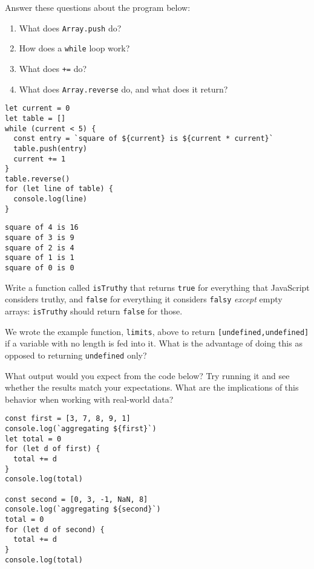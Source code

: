 
Answer these questions about the program below:

\begin{enumerate}
\item
  What does \texttt{Array.push} do?
\item
  How does a \texttt{while} loop work?
\item
  What does \texttt{+=} do?
\item
  What does \texttt{Array.reverse} do, and what does it return?
\end{enumerate}

\begin{verbatim}
let current = 0
let table = []
while (current < 5) {
  const entry = `square of ${current} is ${current * current}`
  table.push(entry)
  current += 1
}
table.reverse()
for (let line of table) {
  console.log(line)
}
\end{verbatim}

\begin{verbatim}
square of 4 is 16
square of 3 is 9
square of 2 is 4
square of 1 is 1
square of 0 is 0
\end{verbatim}


Write a function called \texttt{isTruthy} that returns \texttt{true} for everything that JavaScript considers truthy,
and \texttt{false} for everything it considers \texttt{falsy} \emph{except} empty arrays:
\texttt{isTruthy} should return \texttt{false} for those.


We wrote the example function, \texttt{limits},
above to return \texttt{[undefined,undefined]} if a variable
with no length is fed into it.
What is the advantage of doing this as opposed to
returning \texttt{undefined} only?


What output would you expect from the code below?
Try running it and see whether the results match your expectations.
What are the implications of this behavior when working with real-world data?

\begin{verbatim}
const first = [3, 7, 8, 9, 1]
console.log(`aggregating ${first}`)
let total = 0
for (let d of first) {
  total += d
}
console.log(total)

const second = [0, 3, -1, NaN, 8]
console.log(`aggregating ${second}`)
total = 0
for (let d of second) {
  total += d
}
console.log(total)
\end{verbatim}

